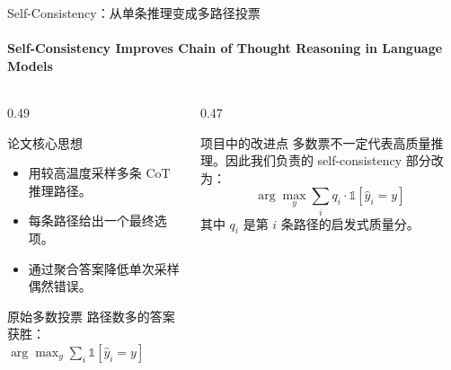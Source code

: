 \documentclass[10pt,aspectratio=169]{beamer}
\newcommand{\tightitems}{\setlength{\itemsep}{0.24em}}
\begin{document}
\begin{frame}{Self-Consistency：从单条推理变成多路径投票}
  \framesubtitle{Self-Consistency Improves Chain of Thought Reasoning in Language Models}
  \begin{columns}[T,onlytextwidth]
    \begin{column}{0.49\textwidth}
      \begin{block}{论文核心思想}
        \begin{itemize}
          \tightitems
          \item 用较高温度采样多条 CoT 推理路径。
          \item 每条路径给出一个最终选项。
          \item 通过聚合答案降低单次采样偶然错误。
        \end{itemize}
      \end{block}
      \begin{block}{原始多数投票}
        \centering
        路径数多的答案获胜：\quad $\arg\max_y \sum_i \mathbb{1}[\hat y_i=y]$
      \end{block}
    \end{column}
    \begin{column}{0.47\textwidth}
      \begin{alertblock}{项目中的改进点}
        多数票不一定代表高质量推理。因此我们负责的 self-consistency 部分改为：
        \[
          \arg\max_y \sum_i q_i \cdot \mathbb{1}[\hat y_i=y]
        \]
        其中 $q_i$ 是第 $i$ 条路径的启发式质量分。
      \end{alertblock}
    \end{column}
  \end{columns}
\end{frame}
\end{document}
